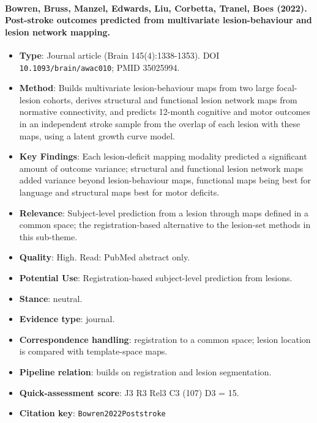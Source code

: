 \documentclass[journal,onecolumn]{IEEEtran}
\begin{document}
\paragraph{Bowren, Bruss, Manzel, Edwards, Liu, Corbetta, Tranel, Boes (2022). Post-stroke outcomes predicted from multivariate lesion-behaviour and lesion network mapping.~\cite{Bowren2022Poststroke}}\mbox{}

\begin{itemize}

\item{} \textbf{Type}: Journal article (Brain 145(4):1338-1353). DOI \nolinkurl{10.1093/brain/awac010}; PMID 35025994.

\item{} \textbf{Method}: Builds multivariate lesion-behaviour maps from two large focal-lesion cohorts, derives structural and functional lesion network maps from normative connectivity, and predicts 12-month cognitive and motor outcomes in an independent stroke sample from the overlap of each lesion with these maps, using a latent growth curve model.

\item{} \textbf{Key Findings}: Each lesion-deficit mapping modality predicted a significant amount of outcome variance; structural and functional lesion network maps added variance beyond lesion-behaviour maps, functional maps being best for language and structural maps best for motor deficits.

\item{} \textbf{Relevance}: Subject-level prediction from a lesion through maps defined in a common space; the registration-based alternative to the lesion-set methods in this sub-theme.

\item{} \textbf{Quality}: High. Read: PubMed abstract only.

\item{} \textbf{Potential Use}: Registration-based subject-level prediction from lesions.

\item{} \textbf{Stance}: neutral.

\item{} \textbf{Evidence type}: journal.

\item{} \textbf{Correspondence handling}: registration to a common space; lesion location is compared with template-space maps.

\item{} \textbf{Pipeline relation}: builds on registration and lesion segmentation.

\item{} \textbf{Quick-assessment score}: J3 R3 Rel3 C3 (107) D3 = 15.

\item{} \textbf{Citation key}: \texttt{Bowren2022Poststroke}

\end{itemize}
\end{document}
